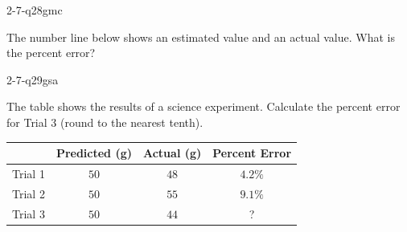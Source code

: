 \begin{practiceQuestion}{2-7-q28}{gmc}
\begin{questionText}
The number line below shows an estimated value and an actual value. What is the percent error?

\begin{center}
\end{center}
\end{questionText}
\end{practiceQuestion}

\begin{practiceQuestion}{2-7-q29}{gsa}
\begin{questionText}
The table shows the results of a science experiment. Calculate the percent error for Trial 3 (round to the nearest tenth).

\begin{center}
\begin{tabular}{|l|c|c|c|}
\hline
 & \textbf{Predicted (g)} & \textbf{Actual (g)} & \textbf{Percent Error} \\
\hline
Trial 1 & $50$ & $48$ & $4.2\%$ \\
\hline
Trial 2 & $50$ & $55$ & $9.1\%$ \\
\hline
Trial 3 & $50$ & $44$ & ? \\
\hline
\end{tabular}
\end{center}
\end{questionText}
\end{practiceQuestion}

